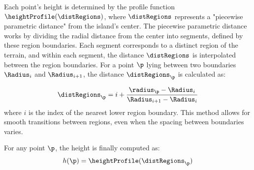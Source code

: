 Each point's height is determined by the profile function $\heightProfile(\distRegions)$, where $\distRegions$ represents a "piecewise parametric distance" from the island's center. The piecewise parametric distance works by dividing the radial distance from the center into segments, defined by these region boundaries. Each segment corresponds to a distinct region of the terrain, and within each segment, the distance $\distRegions$ is interpolated between the region boundaries. For a point $\p$ lying between two boundaries $\Radius_{i}$ and $\Radius_{i+1}$, the distance $\distRegions_\p$ is calculated as:

\begin{align}
    \distRegions_\p = i + \frac{\radius_\p - \Radius_{i}}{\Radius_{i + 1} - \Radius_{i}}
\end{align}
where $i$ is the index of the nearest lower region boundary. This method allows for smooth transitions between regions, even when the spacing between boundaries varies. 



For any point $\p$, the height is finally computed as:
\begin{align}
    h(\p) = \heightProfile(\distRegions_\p)
\end{align}

